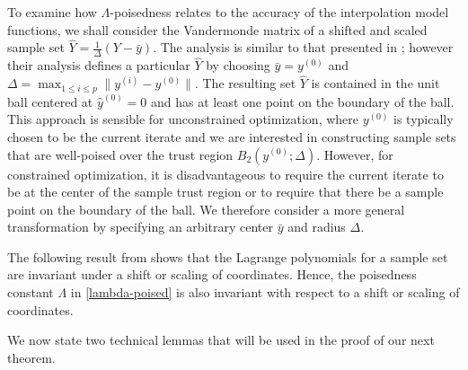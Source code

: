 \documentclass{article}
\begin{document}
To examine how $\Lambda$-poisedness relates to the accuracy of the interpolation model functions, we shall consider the Vandermonde matrix of a shifted and scaled sample set $\hat{Y} = \frac{1}{\Delta}(Y-\bar{y})$.  The analysis is similar to that presented in \cite{introduction_book}; however their analysis defines a particular  $\hat{Y}$ by choosing $\bar{y} = y^{(0)}$ and $\Delta = \max_{1 \le i \le p} \| y^{(i)}-y^{(0)}\|$.  The resulting set $\hat{Y}$  is contained in the unit ball centered at $\hat{y}^{(0)} = 0$ and has at least one point on the boundary of the ball.    This approach is sensible for unconstrained optimization, where  $y^{(0)}$ is typically chosen to be the current iterate and we are interested in constructing sample sets that are well-poised over the trust region $B_2(y^{(0)};\Delta)$.    However, for constrained optimization,  it is disadvantageous to require the current iterate to be at the center of the sample trust region or to require that there be a sample point on the boundary of the ball.   We therefore consider a more general transformation by specifying an arbitrary center $\bar{y}$ and radius $\Delta$.  

The following result from \cite[Lemmas 3.8 \& 3.9]{introduction_book} shows that the
Lagrange polynomials for a sample set are invariant under a shift or scaling of coordinates.     Hence, the poisedness constant  $\Lambda$ in \cref{lambda-poised}  is also invariant  with respect to a shift or scaling of coordinates. 

 

We now state two technical lemmas that will be used in the proof of our next theorem.

\end{document}
